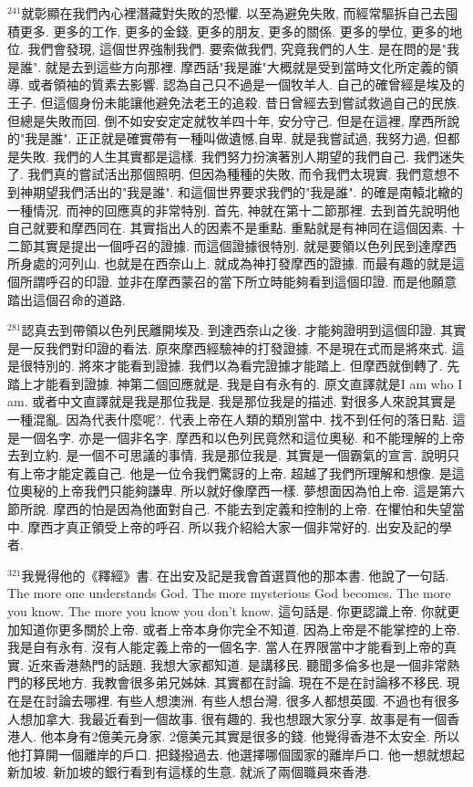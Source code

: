 \documentclass{book}
\begin{document}
$^{241}$就彰顯在我們內心裡潛藏對失敗的恐懼.
以至為避免失敗, 而經常驅拆自己去囤積更多.
更多的工作, 更多的金錢, 更多的朋友, 更多的關係.
更多的學位, 更多的地位.
我們會發現, 這個世界強制我們.
要索做我們, 究竟我們的人生.
是在問的是"我是誰".
就是去到這些方向那裡.
摩西話"我是誰"大概就是受到當時文化所定義的領導.
或者領袖的質素去影響.
認為自己只不過是一個牧羊人.
自己的確曾經是埃及的王子.
但這個身份未能讓他避免法老王的追殺.
昔日曾經去到嘗試救過自己的民族.
但總是失敗而回.
倒不如安安定定就牧羊四十年, 安分守己.
但是在這裡, 摩西所說的"我是誰".
正正就是確實帶有一種叫做遺憾,自卑.
就是我嘗試過, 我努力過, 但都是失敗.
我們的人生其實都是這樣.
我們努力扮演著別人期望的我們自己.
我們迷失了.
我們真的嘗試活出那個照明.
但因為種種的失敗, 而令我們太現實.
我們意想不到神期望我們活出的"我是誰".
和這個世界要求我們的"我是誰".
的確是南轅北轍的一種情況.
而神的回應真的非常特別.
首先, 神就在第十二節那裡.
去到首先說明他自己就要和摩西同在.
其實指出人的因素不是重點.
重點就是有神同在這個因素.
十二節其實是提出一個呼召的證據.
而這個證據很特別.
就是要領以色列民到達摩西所身處的河列山.
也就是在西奈山上.
就成為神打發摩西的證據.
而最有趣的就是這個所謂呼召的印證.
並非在摩西蒙召的當下所立時能夠看到這個印證.
而是他願意踏出這個召命的道路.

$^{281}$認真去到帶領以色列民離開埃及.
到達西奈山之後.
才能夠證明到這個印證.
其實是一反我們對印證的看法.
原來摩西經驗神的打發證據.
不是現在式而是將來式.
這是很特別的.
將來才能看到證據.
我們以為看完證據才能踏上.
但摩西就倒轉了.
先踏上才能看到證據.
神第二個回應就是.
我是自有永有的.
原文直譯就是I am who I am.
或者中文直譯就是我是那位我是.
我是那位我是的描述.
對很多人來說其實是一種混亂.
因為代表什麼呢?.
代表上帝在人類的類別當中.
找不到任何的落日點.
這是一個名字.
亦是一個非名字.
摩西和以色列民竟然和這位奧秘.
和不能理解的上帝去到立約.
是一個不可思議的事情.
我是那位我是.
其實是一個霸氣的宣言.
說明只有上帝才能定義自己.
他是一位令我們驚訝的上帝.
超越了我們所理解和想像.
是這位奧秘的上帝我們只能夠謙卑.
所以就好像摩西一樣.
夢想面因為怕上帝.
這是第六節所說.
摩西的怕是因為他面對自己.
不能去到定義和控制的上帝.
在懼怕和失望當中.
摩西才真正領受上帝的呼召.
所以我介紹給大家一個非常好的.
出安及記的學者.

$^{321}$我覺得他的《釋經》書.
在出安及記是我會首選買他的那本書.
他說了一句話.
The more one understands God.
The more mysterious God becomes.
The more you know.
The more you know you don't know.
這句話是.
你更認識上帝.
你就更加知道你更多關於上帝.
或者上帝本身你完全不知道.
因為上帝是不能掌控的上帝.
我是自有永有.
沒有人能定義上帝的一個名字.
當人在界限當中才能看到上帝的真實.
近來香港熱門的話題.
我想大家都知道.
是講移民.
聽聞多倫多也是一個非常熱門的移民地方.
我教會很多弟兄姊妹.
其實都在討論.
現在不是在討論移不移民.
現在是在討論去哪裡.
有些人想澳洲.
有些人想台灣.
很多人都想英國.
不過也有很多人想加拿大.
我最近看到一個故事.
很有趣的.
我也想跟大家分享.
故事是有一個香港人.
他本身有2億美元身家.
2億美元其實是很多的錢.
他覺得香港不太安全.
所以他打算開一個離岸的戶口.
把錢撥過去.
他選擇哪個國家的離岸戶口.
他一想就想起新加坡.
新加坡的銀行看到有這樣的生意.
就派了兩個職員來香港.
\end{document}
